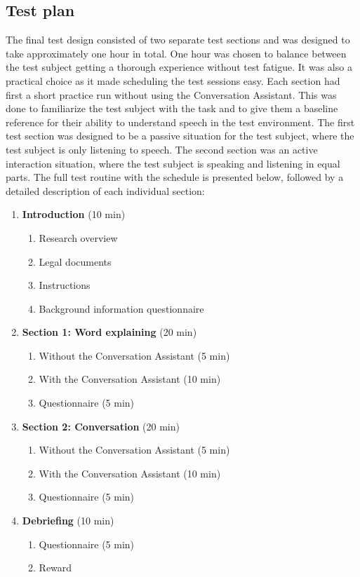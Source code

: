 \documentclass[english, 12pt, a4paper, pdftex, elec, utf8]{aaltothesis}
\begin{document}
\subsection{Test plan} \label{sec:testplan}

The final test design consisted of two separate test sections and was designed to take approximately one hour in total. One hour was chosen to balance between the test subject getting a thorough experience without test fatigue. It was also a practical choice as it made scheduling the test sessions easy. Each section had first a short practice run without using the Conversation Assistant. This was done to familiarize the test subject with the task and to give them a baseline reference for their ability to understand speech in the test environment. The first test section was designed to be a passive situation for the test subject, where the test subject is only listening to speech. The second section was an active interaction situation, where the test subject is speaking and listening in equal parts. The full test routine with the schedule is presented below, followed by a detailed description of each individual section:
\vspace{2mm}
\begin{enumerate}[font=\bfseries]
	\item \textbf{Introduction} (10 min)
	\begin{enumerate}[label*=\arabic*.]
		\item Research overview
		\item Legal documents
		\item Instructions
		\item Background information questionnaire
	\end{enumerate}
	\item \textbf{Section 1: Word explaining} (20 min)
	\begin{enumerate}[label*=\arabic*.]
		\item Without the Conversation Assistant (5 min)
		\item With the Conversation Assistant (10 min)
		\item Questionnaire (5 min)
	\end{enumerate}
	\item \textbf{Section 2: Conversation} (20 min)
	\begin{enumerate}[label*=\arabic*.]
		\item Without the Conversation Assistant (5 min)
		\item With the Conversation Assistant (10 min)
		\item Questionnaire (5 min)
	\end{enumerate}
	\item \textbf{Debriefing} (10 min)
	\begin{enumerate}[label*=\arabic*.]
		\item Questionnaire (5 min)
		\item Reward \\
	\end{enumerate}
\end{enumerate}
\end{document}
